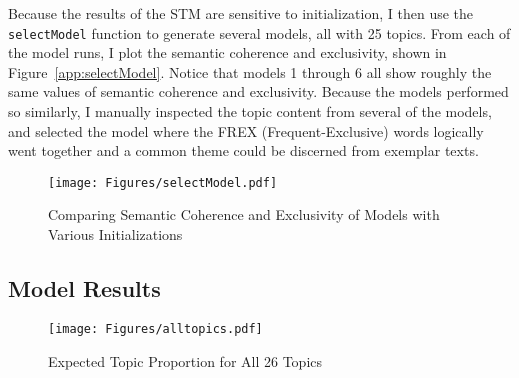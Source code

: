 \documentclass[12pt]{article}
\begin{document}
\begin{appendices}
\begin{refsection}
Because the results of the STM are sensitive to initialization, I then use the \texttt{selectModel} function to generate several models, all with 25 topics. From each of the model runs, I plot the semantic coherence and exclusivity, shown in Figure~\ref{app:selectModel}. Notice that models 1 through 6 all show roughly the same values of semantic coherence and exclusivity. Because the models performed so similarly, I manually inspected the topic content from several of the models, and selected the model where the FREX (Frequent-Exclusive) words logically went together and a common theme could be discerned from exemplar texts. 

\begin{figure}[t!]
	\centering
	\texttt{[image: Figures/selectModel.pdf]}
	\caption{Comparing Semantic Coherence and Exclusivity of Models with Various Initializations}\label{fig:selectModel}
\end{figure}
\clearpage


\subsection{Model Results}\label{app:stmresults}

\begin{figure}[h!]
	\centering
	\texttt{[image: Figures/alltopics.pdf]}
	\caption{Expected Topic Proportion for All 26 Topics}\label{fig:alltopics}
\end{figure}


\end{refsection}
\end{appendices}
\end{document}
